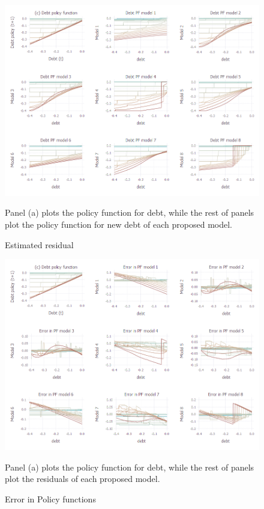 \documentclass[12pt, a4paper]{article}
\begin{document}
\begin{figure}[!hbt]
	\centering
	\caption{Estimated residual}
	\includegraphics[scale=0.5]{../Plots/PFB.png}
	\begin{minipage}{0.85\textwidth}
		{\scriptsize Panel (a)  plots the policy function for debt, while the rest of panels plot the policy function for new debt of each proposed model.\par}
	\end{minipage}
\end{figure}

\begin{figure}[!hbt]
	\centering
	\caption{Error in Policy functions}
	\includegraphics[scale=0.5]{../Plots/PFBerror.png}
	\begin{minipage}{0.85\textwidth}
		{\scriptsize Panel (a)  plots the policy function for debt, while the rest of panels plot the residuals of each proposed model.\par}
	\end{minipage}
	\label{fig:erroPF}
\end{figure}
\end{document}
